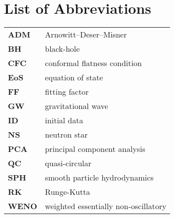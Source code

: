 \chapter*{List of Abbreviations}


\begin{flushleft}
\begin{tabular}{l l}

\textbf{ADM} & \qquad\qquad\qquad Arnowitt–Deser–Misner \\
\textbf{BH} & \qquad\qquad\qquad black-hole \\
\textbf{CFC} & \qquad\qquad\qquad conformal flatness condition \\
\textbf{EoS} & \qquad\qquad\qquad equation of state \\
\textbf{FF} & \qquad\qquad\qquad fitting factor \\
\textbf{GW}  & \qquad\qquad\qquad gravitational wave\\
\textbf{ID} & \qquad\qquad\qquad initial data\\
\textbf{NS} & \qquad\qquad\qquad neutron star\\
\textbf{PCA} & \qquad\qquad\qquad principal component analysis\\
\textbf{QC} & \qquad\qquad\qquad quasi-circular\\
\textbf{SPH} & \qquad\qquad\qquad smooth particle hydrodynamics\\
\textbf{RK} & \qquad\qquad\qquad Runge-Kutta \\
\textbf{WENO} & \qquad\qquad\qquad weighted essentially non-oscillatory\\

\end{tabular}
\end{flushleft}


